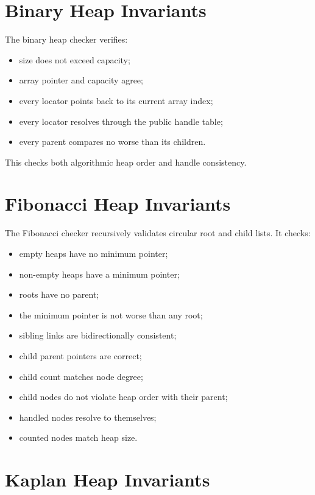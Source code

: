 \section{Binary Heap Invariants}

The binary heap checker verifies:

\begin{itemize}
    \item size does not exceed capacity;
    \item array pointer and capacity agree;
    \item every locator points back to its current array index;
    \item every locator resolves through the public handle table;
    \item every parent compares no worse than its children.
\end{itemize}

This checks both algorithmic heap order and handle consistency.

\section{Fibonacci Heap Invariants}

The Fibonacci checker recursively validates circular root and child lists.
It checks:

\begin{itemize}
    \item empty heaps have no minimum pointer;
    \item non-empty heaps have a minimum pointer;
    \item roots have no parent;
    \item the minimum pointer is not worse than any root;
    \item sibling links are bidirectionally consistent;
    \item child parent pointers are correct;
    \item child count matches node degree;
    \item child nodes do not violate heap order with their parent;
    \item handled nodes resolve to themselves;
    \item counted nodes match heap size.
\end{itemize}

\section{Kaplan Heap Invariants}

